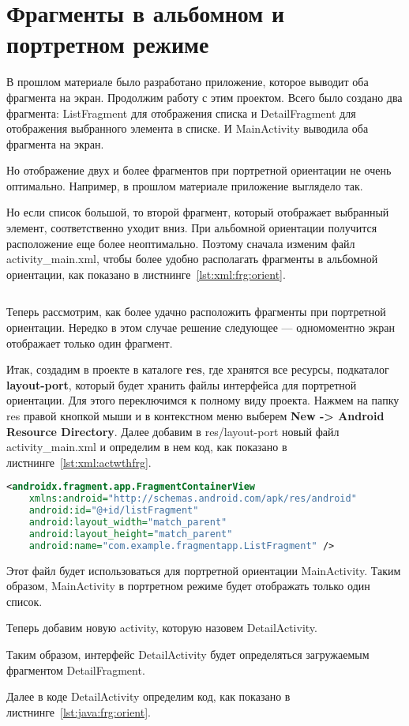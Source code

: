 \section{Фрагменты в альбомном и портретном режиме}
В прошлом материале было разработано приложение, которое выводит оба
фрагмента на экран. Продолжим работу с этим проектом. Всего было создано
два фрагмента: ListFragment для отображения списка и DetailFragment для
отображения выбранного элемента в списке. И MainActivity выводила оба
фрагмента на экран.\par
Но отображение двух и более фрагментов при портретной ориентации не
очень оптимально. Например, в прошлом материале приложение выглядело
так.\par
Но если список большой, то второй фрагмент, который отображает
выбранный элемент, соответственно уходит вниз. При альбомной
ориентации получится расположение еще более неоптимально. Поэтому
сначала изменим файл activity\_main.xml, чтобы более удобно располагать
фрагменты в альбомной ориентации, как показано
в листнинге~\ref{lst:xml:frg:orient}.

\begin{lstlisting}[language=XML
	, caption=\leftline{}
	, label=lst:xml:frg:orient
	]
\end{lstlisting}

Теперь рассмотрим, как более удачно расположить фрагменты при
портретной ориентации. Нередко в этом случае решение следующее ---
одномоментно экран отображает только один фрагмент.\par
Итак, создадим в проекте в каталоге \textbf{res}, где хранятся все ресурсы,
подкаталог \textbf{layout-port}, который будет хранить файлы интерфейса
для портретной ориентации. Для этого переключимся к полному виду проекта.
Нажмем на папку res правой кнопкой мыши и в контекстном меню выберем
\textbf{New -> Android Resource Directory}.
Далее добавим в res/layout-port новый файл activity\_main.xml и определим в
нем код, как показано в листнинге~\ref{lst:xml:actwthfrg}.

\begin{lstlisting}[language=XML
	, caption=\leftline{}
	, label=lst:xml:actwthfrg
	]
<androidx.fragment.app.FragmentContainerView
	xmlns:android="http://schemas.android.com/apk/res/android"
	android:id="@+id/listFragment"
	android:layout_width="match_parent"
	android:layout_height="match_parent"
	android:name="com.example.fragmentapp.ListFragment" />
\end{lstlisting}

Этот файл будет использоваться для портретной ориентации MainActivity.
Таким образом, MainActivity в портретном режиме будет отображать только
один список.\par
Теперь добавим новую activity, которую назовем DetailActivity.\par
Таким образом, интерфейс DetailActivity будет определяться загружаемым
фрагментом DetailFragment.\par
Далее в коде DetailActivity определим код, как показано
в листнинге~\ref{lst:java:frg:orient}.

